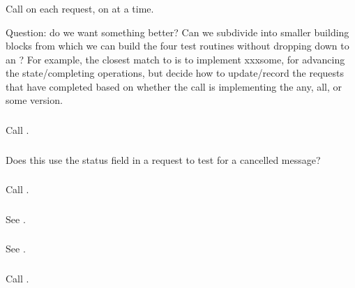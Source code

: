 \documentclass{article}
\begin{document}
\subsubsection{}

\subsubsection{}
Call  on each request, on at a time.

Question: do we want something better?  Can we subdivide
 into smaller building blocks from which we
can build the four test routines without dropping down to an
?  For example, the closest match to  is to
implement xxxsome, for advancing the state/completing operations, but decide
how to update/record the requests that have completed based on whether the
call is implementing the any, all, or some version.

\subsubsection{}
Call .

\subsubsection{}
Does this use the status field in a request to test for a cancelled message?

\subsubsection{}
Call .

\subsubsection{}
See .

\subsubsection{}
See .

\subsubsection{}
Call .
\end{document}
